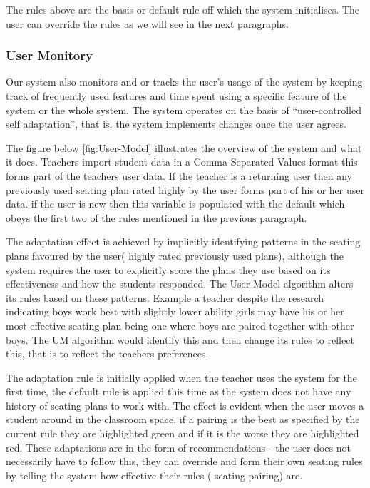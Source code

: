 The rules above are the basis or default rule off which the system initialises. The user can override the rules as we will see in the next paragraphs.
\subsubsection{User Monitory}
Our system also monitors and or tracks the user's usage of the system by keeping track of frequently used features and time spent using a specific feature of the system or the whole system. The system operates on the basis of ``user-controlled self adaptation'', that is, the system implements changes once the user agrees.

The figure below \ref{fig:User-Model} illustrates the overview of the system and what it does. Teachers import student data in a Comma Separated Values format this forms part of the teachers user data. If the teacher is a returning user then any previously used seating plan rated highly by the user forms part of his or her user data. if the user is new then this variable is populated with the default which obeys the first two of the rules mentioned in the previous paragraph.

The adaptation effect is achieved by implicitly identifying patterns in the seating plans favoured by the user( highly rated previously used plans), although the system requires the user to explicitly score the plans they use based on its effectiveness and how the students responded. The User Model algorithm alters its rules based on these patterns. Example a teacher despite the research indicating boys work best with slightly lower ability girls may have his or her most effective seating plan being one where boys are paired together with other boys. The UM algorithm would identify this and then change its rules to reflect this, that is to reflect the teachers preferences.

The adaptation rule is initially applied when the teacher uses the system for the first time, the default rule is applied this time as the system does not have any history of seating plans to work with. The effect is evident when the user moves a student around in the classroom space, if a pairing is the best as specified by the current rule they are highlighted green and if it is the worse they are highlighted red. These adaptations are in the form of recommendations - the user does not necessarily have to follow this, they can override and form their own seating rules by telling the system how effective their rules ( seating pairing) are.


